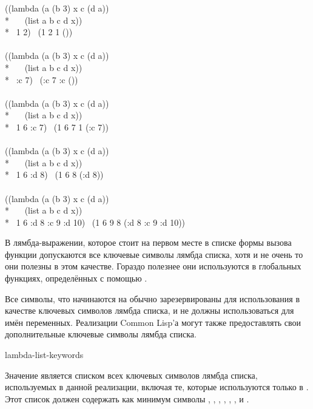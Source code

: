 \begin{lisp}
((lambda (a  (b 3)  x  c (d a)) \\*
~~~(list a b c d x)) \\*
~1 2)   \EV\ (1 2 {\nil} 1 ()) \\
 \\
((lambda (a  (b 3)  x  c (d a)) \\*
~~~(list a b c d x)) \\*
~:c 7)   \EV\ (:c 7 {\nil} :c ()) \\
 \\
((lambda (a  (b 3)  x  c (d a)) \\*
~~~(list a b c d x)) \\*
~1 6 :c 7)   \EV\ (1 6 7 1 (:c 7)) \\
 \\
((lambda (a  (b 3)  x  c (d a)) \\*
~~~(list a b c d x)) \\*
~1 6 :d 8)   \EV\ (1 6 {\nil} 8 (:d 8)) \\
 \\
((lambda (a  (b 3)  x  c (d a)) \\*
~~~(list a b c d x)) \\*
~1 6 :d 8 :c 9 :d 10)   \EV\ (1 6 9 8 (:d 8 :c 9 :d 10))
\end{lisp}

В лямбда-выражении, которое стоит на первом месте в списке формы вызова функции
допускаются все ключевые символы лямбда списка, хотя и не очень то они полезны в
этом качестве.
Гораздо полезнее они используются в глобальных функциях, определённых с помощью
.

Все символы, что начинаются на \cd{\&} обычно зарезервированы для использования в
качестве ключевых символов лямбда списка, и не должны использоваться для имён
переменных.
Реализации Common Lisp'а могут также предоставлять свои дополнительные ключевые
символы лямбда списка.

\begin{defun}[Constant]
lambda-list-keywords

Значение  является списком всех ключевых символов
лямбда списка, используемых в данной реализации, включая те, которые
используются только в . Этот список должен содержать как минимум
символы , , , , , , 
и .
\end{defun}

